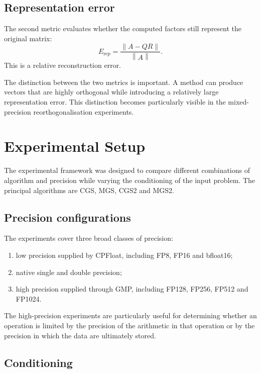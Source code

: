 \documentclass[a4paper,11pt]{article}
\newcommand{\norm}[1]{\left\lVert #1 \right\rVert}
\begin{document}
\subsection{Representation error}

The second metric evaluates whether the computed factors still represent the
original matrix:
\[
    E_{\mathrm{rep}}
    =
    \frac{\norm{A-QR}}{\norm{A}}.
\]
This is a relative reconstruction error.

The distinction between the two metrics is important. A method can produce
vectors that are highly orthogonal while introducing a relatively large
representation error. This distinction becomes particularly visible in the
mixed-precision reorthogonalisation experiments.

\section{Experimental Setup}

The experimental framework was designed to compare different combinations of
algorithm and precision while varying the conditioning of the input problem.
The principal algorithms are CGS, MGS, CGS2 and MGS2.

\subsection{Precision configurations}

The experiments cover three broad classes of precision:

\begin{enumerate}
    \item low precision supplied by CPFloat, including FP8, FP16 and bfloat16;
    \item native single and double precision;
    \item high precision supplied through GMP, including FP128, FP256,
    FP512 and FP1024.
\end{enumerate}

The high-precision experiments are particularly useful for determining whether
an operation is limited by the precision of the arithmetic in that operation
or by the precision in which the data are ultimately stored.

\subsection{Conditioning}
\end{document}
